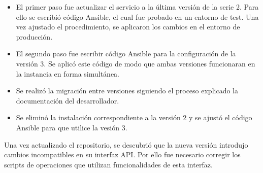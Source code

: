 \begin{itemize}
\item El primer paso fue actualizar el servicio a la última versión de la serie 2. Para ello se escribió código Ansible, el cual fue probado en un entorno de test. Una vez ajustado el procedimiento, se aplicaron los cambios en el entorno de producción.
\item El segundo paso fue escribir código Ansible para la configuración de la versión 3. Se aplicó este código de modo que ambas versiones funcionaran en la instancia en forma simultánea.
\item Se realizó la migración entre versiones siguiendo el proceso explicado la documentación del desarrollador.
\item Se eliminó la instalación correspondiente a la versión 2 y se ajustó el código Ansible para que utilice la vesión 3.
\end{itemize}
Una vez actualizado el repositorio, se descubrió que la nueva versión introdujo cambios incompatibles en su interfaz API. Por ello fue necesario corregir los scripts de operaciones que utilizan funcionalidades de esta interfaz.


